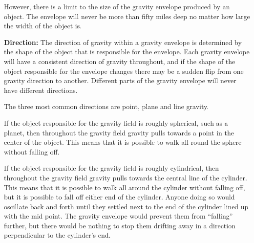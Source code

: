 \begin{multicols*}{2}
However, there is a limit to the size of the gravity envelope produced by an object. The envelope will never be more than fifty miles deep no matter how large the width of the object is.


\textbf{Direction:} The direction of gravity within a gravity envelope is determined by the shape of the object that is responsible for the envelope. Each gravity envelope will have a consistent direction of gravity throughout, and if the shape of the object responsible for the envelope changes there may be a sudden flip from one gravity direction to another. Different parts of the gravity envelope will never have different directions.

The three most common directions are point, plane and line gravity.

If the object responsible for the gravity field is roughly spherical, such as a planet, then throughout the gravity field gravity pulls towards a point in the center of the object. This means that it is possible to walk all round the sphere without falling off.

If the object responsible for the gravity field is roughly cylindrical, then throughout the gravity field gravity pulls towards the central line of the cylinder. This means that it is possible to walk all around the cylinder without falling off, but it is possible to fall off either end of the cylinder. Anyone doing so would oscillate back and forth until they settled next to the end of the cylinder lined up with the mid point. The gravity envelope would prevent them from “falling” further, but there would be nothing to stop them drifting away in a direction perpendicular to the cylinder’s end.


\end{multicols*}
